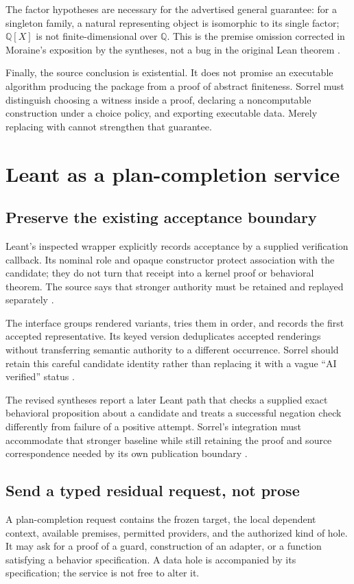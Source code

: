 \documentclass[11pt,a4paper]{article}
\newcommand{\code}[1]{\texttt{\detokenize{#1}}}
\newcommand{\Q}{\mathbb Q}\newcommand{\R}{\mathbb R}\newcommand{\C}{\mathbb C}
\numberwithin{equation}{section}
\theoremstyle{definition}\newtheorem{definition}[theorem]{Definition}
\theoremstyle{remark}\newtheorem{remark}[theorem]{Remark}
\begin{document}
The factor hypotheses are necessary for the advertised general guarantee:
for a singleton family, a natural representing object is isomorphic to its
single factor; \(\Q[X]\) is not finite-dimensional over \(\Q\). This is the
premise omission corrected in Moraine's exposition by the syntheses, not a
bug in the original Lean theorem \cite{synA,synB,tensor}.

Finally, the source conclusion is existential. It does not promise an
executable algorithm producing the package from a proof of abstract finiteness.
Sorrel must distinguish choosing a witness inside a proof, declaring a
noncomputable construction under a choice policy, and exporting executable
data. Merely replacing \code{exists} with \code{construct} cannot strengthen
that guarantee.

\section{Leant as a plan-completion service}\label{sec:leant}

\subsection{Preserve the existing acceptance boundary}
Leant's inspected \code{Verified} wrapper explicitly records acceptance by a
supplied verification callback. Its nominal role and opaque constructor protect
association with the candidate; they do not turn that receipt into a kernel
proof or behavioral theorem. The source says that stronger authority must be
retained and replayed separately \cite{leantVerify}.

The interface groups rendered variants, tries them in order, and records the
first accepted representative. Its keyed version deduplicates accepted
renderings without transferring semantic authority to a different occurrence.
Sorrel should retain this careful candidate identity rather than replacing it
with a vague ``AI verified'' status \cite{leantVerify}.

The revised syntheses report a later Leant path that checks a supplied exact
behavioral proposition about a candidate and treats a successful negation
check differently from failure of a positive attempt. Sorrel's integration
must accommodate that stronger baseline while still retaining the proof and
source correspondence needed by its own publication boundary
\cite{synA,synB}.

\subsection{Send a typed residual request, not prose}
A plan-completion request contains the frozen target, the local dependent
context, available premises, permitted providers, and the authorized kind of
hole. It may ask for a proof of a guard, construction of an adapter, or a
function satisfying a behavior specification. A data hole is accompanied by
its specification; the service is not free to alter it.
\end{document}
